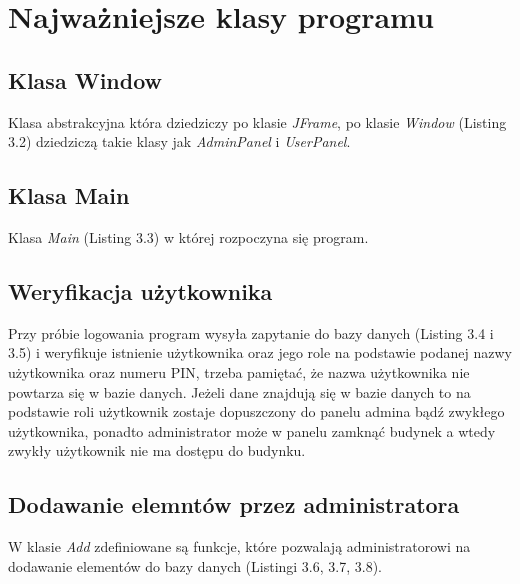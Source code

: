 \newpage
\section{Najważniejsze klasy programu}
\subsection{Klasa Window}
Klasa abstrakcyjna która dziedziczy po klasie \textit{JFrame}, po klasie \textit{Window} (Listing 3.2) dziedziczą takie klasy jak \textit{AdminPanel} i \textit{UserPanel}.


\newpage
\subsection{Klasa Main}
Klasa \textit{Main} (Listing 3.3) w której rozpoczyna się program.


\subsection{Weryfikacja użytkownika}
Przy próbie logowania program wysyła zapytanie do bazy danych (Listing 3.4 i 3.5) i weryfikuje istnienie użytkownika oraz jego role na podstawie podanej
nazwy użytkownika oraz numeru PIN, trzeba pamiętać, że nazwa użytkownika nie powtarza się w bazie danych. Jeżeli dane znajdują się 
w bazie danych to na podstawie roli użytkownik zostaje dopuszczony do panelu admina bądź zwykłego użytkownika, ponadto administrator 
może w panelu zamknąć budynek a wtedy zwykły użytkownik nie ma dostępu do budynku.


\newpage


\subsection{Dodawanie elemntów przez administratora}
W klasie \textit{Add} zdefiniowane są funkcje, które pozwalają administratorowi na dodawanie elementów do bazy danych (Listingi 3.6, 3.7, 3.8).

\newpage 


